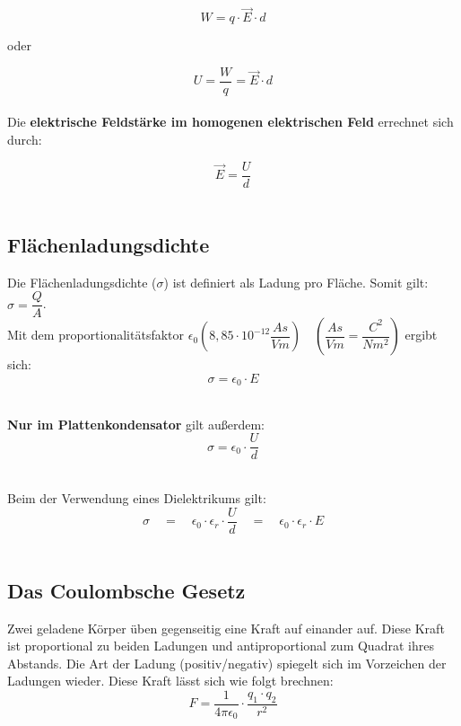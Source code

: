 \documentclass[a4paper]{article}
\begin{document}
\Large$$W = q \cdot \vec{E} \cdot d$$\normalsize

\begin{center}
	\vspace{0,4cm}oder
\end{center}

\Large$$U = \dfrac{W}{q} = \vec{E} \cdot d$$\normalsize\\

Die \textbf{elektrische Feldstärke im homogenen elektrischen Feld} errechnet sich durch:

\Large$$\vec{E} = \dfrac{U}{d}$$\normalsize\\



\subsection{Flächenladungsdichte}

Die Flächenladungsdichte ($\sigma$) ist definiert als Ladung pro Fläche. Somit gilt:$\sigma = \dfrac{Q}{A}$.\\
Mit dem proportionalitätsfaktor $\epsilon_0 (8,85\cdot10^{-12}\dfrac{As}{Vm}) \quad (\dfrac{As}{Vm} = \dfrac{C^2}{Nm^2})$ ergibt sich:\\
\Large$$\sigma = \epsilon_0 \cdot E$$\\ \normalsize

\textbf{Nur im Plattenkondensator} gilt außerdem:\\
\Large$$\sigma = \epsilon_0 \cdot \dfrac{U}{d}$$\\ \normalsize

Beim der Verwendung eines Dielektrikums gilt:\\
\Large$$\sigma \quad=\quad \epsilon_0 \cdot \epsilon_r \cdot \dfrac{U}{d} \quad=\quad \epsilon_0 \cdot \epsilon_r \cdot E$$\\ \normalsize


\subsection{Das Coulombsche Gesetz}

Zwei geladene Körper üben gegenseitig eine Kraft auf einander auf. Diese Kraft ist proportional zu beiden Ladungen
und antiproportional zum Quadrat ihres Abstands. Die Art der Ladung (positiv/negativ) spiegelt sich im Vorzeichen
der Ladungen wieder. Diese Kraft lässt sich wie folgt brechnen:\\

\Large$$F = \dfrac{1}{4\pi \epsilon_0} \cdot \dfrac{q_1 \cdot q_2}{r^2}$$\\ \normalsize
\end{document}
